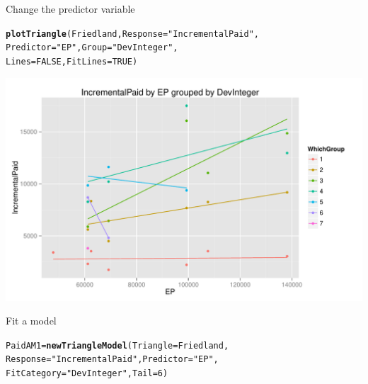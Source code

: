 \documentclass[xcolor=dvipsnames]{beamer}\usepackage{graphicx, color}
\makeatletter
\def\maxwidth{ %
  \ifdim\Gin@nat@width>\linewidth
    \linewidth
  \else
    \Gin@nat@width
  \fi
}
\newcommand{\hlfunctioncall}[1]{\textcolor[rgb]{0.501960784313725,0,0.329411764705882}{\textbf{#1}}}%
\newcommand{\hlstring}[1]{\textcolor[rgb]{0.6,0.6,1}{#1}}%
\newenvironment{kframe}{%
 \def\at@end@of@kframe{}%
 \ifinner\ifhmode%
  \def\at@end@of@kframe{\end{minipage}}%
  \begin{minipage}{\columnwidth}%
 \fi\fi%
 \def\FrameCommand##1{\hskip\@totalleftmargin \hskip-\fboxsep
 \colorbox{shadecolor}{##1}\hskip-\fboxsep
     \hskip-\linewidth \hskip-\@totalleftmargin \hskip\columnwidth}%
 \MakeFramed {\advance\hsize-\width
   \@totalleftmargin\z@ \linewidth\hsize
   \@setminipage}}%
 {\par\unskip\endMakeFramed%
 \at@end@of@kframe}
\newenvironment{knitrout}{}{} %
\makeatother
\begin{document}
\begin{frame}[fragile]{Change the predictor variable}
\begin{knitrout}
\color{fgcolor}\begin{kframe}
\begin{alltt}
\hlfunctioncall{plotTriangle}(Friedland, Response = \hlstring{"IncrementalPaid"}, 
    Predictor = \hlstring{"EP"}, Group = \hlstring{"DevInteger"}, 
    Lines = FALSE, FitLines = TRUE)
\end{alltt}
\end{kframe}
\includegraphics[width=\maxwidth]{figure/Friedland4} 

\end{knitrout}

\end{frame}

\begin{frame}[fragile]{Fit a model}
\begin{knitrout}
\color{fgcolor}\begin{kframe}
\begin{alltt}
PaidAM1 = \hlfunctioncall{newTriangleModel}(Triangle = Friedland, 
    Response = \hlstring{"IncrementalPaid"}, Predictor = \hlstring{"EP"}, 
    FitCategory = \hlstring{"DevInteger"}, Tail = 6)
\end{alltt}
\end{kframe}
\end{knitrout}

\end{frame}
\end{document}
